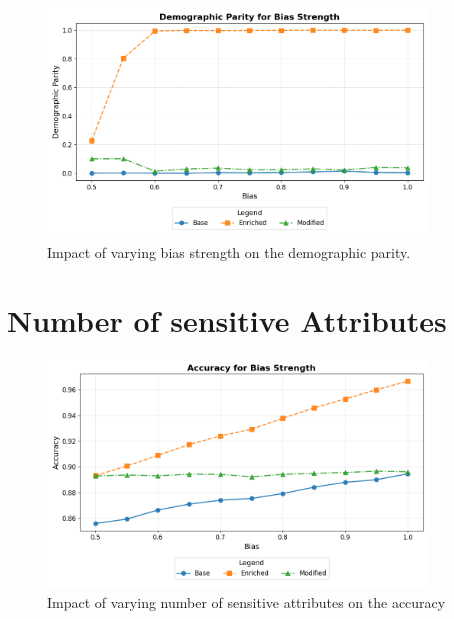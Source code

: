 \begin{figure}[h!]
    \centering
    \includegraphics[width=0.9\textwidth]{gfx/ablation_bias_fairness.png}
    \caption{Impact of varying bias strength on the demographic parity.}
    \label{fig:ablation_bias_fairness}
\end{figure}




\section{Number of sensitive Attributes}



\begin{figure}[h!]
    \centering
    \includegraphics[width=0.9\textwidth]{gfx/ablation_attributes_accuracy.png}
    \caption{Impact of varying number of sensitive attributes on the accuracy}
    \label{fig:ablation_attributes_accuracy}
\end{figure}

